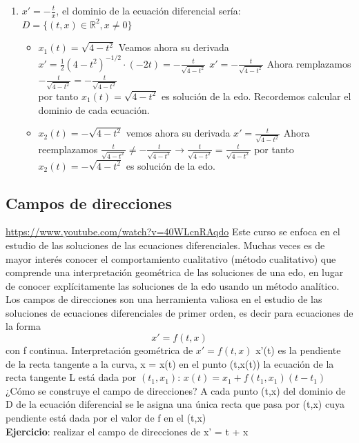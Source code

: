 \documentclass{book}
\begin{document}
\begin{enumerate}
         \item $x'=-\frac{t}{x}$, el dominio de la ecuación diferencial sería: $ D=\{(t,x)\in \mathbb{R}^{2}, x \neq 0\} $
            \begin{itemize}
                 \item $x_{1}(t)=\sqrt{4-t^{2}}$ Veamos ahora su derivada
                 $x' = \frac{1}{2}(4-t^{2})^{-1/2} \cdot (-2t) = -\frac{t}{\sqrt{4-t^{2}}}$
                 $x' = -\frac{t}{\sqrt{4-t^{2}}}$
                Ahora remplazamos\\
                $-\frac{t}{\sqrt{4-t^{2}}} = -\frac{t}{\sqrt{4-t^{2}}} $\\
                 por tanto $x_{1}(t)=\sqrt{4-t^{2}}$ es solución de la edo.
                 Recordemos calcular el dominio de cada ecuación.
                 \item $x_{2}(t)=-\sqrt{4-t^{2}}$ vemos ahora su derivada
                 $x'=\frac{t}{\sqrt{4-t^{2}}}$ Ahora reemplazamos
                 $\frac{t}{\sqrt{4-t^{2}}} \neq -\frac{t}{\sqrt{4-t^{2}}} \rightarrow \frac{t}{\sqrt{4-t^{2}}} = \frac{t}{\sqrt{4-t^{2}}}$
                 por tanto $x_{2}(t)=-\sqrt{4-t^{2}}$ es solución de la edo.
            \end{itemize}
    \end{enumerate}
    \subsection{Campos de direcciones}
     \url{https://www.youtube.com/watch?v=40WLcnRAqdo}
    Este curso se enfoca en el estudio de las soluciones de las ecuaciones
    diferenciales.
    Muchas veces es de mayor interés conocer el comportamiento cualitativo
    (método cualitativo) que comprende una interpretación geométrica de las
    soluciones de una edo, en lugar de conocer explícitamente las soluciones
    de la edo usando un método analítico.
    Los campos de direcciones son una herramienta valiosa en el estudio de
     las soluciones de ecuaciones diferenciales de primer orden, es decir para
    ecuaciones de la forma
    \begin{equation*}
        x'=f(t,x)
    \end{equation*}
     con f continua.
     Interpretación geométrica de $x'=f(t,x)$
    x'(t) es la pendiente de la recta tangente a la curva, x = x(t) en el punto (t,x(t))
     la ecuación de la recta tangente L está dada por $(t_{1},x_{1})$: $x(t)=x_{1}+f(t_{1},x_{1})(t-t_{1})$
     ¿Cómo se construye el campo de direcciones?
     A cada punto (t,x) del dominio de D de la ecuación diferencial se le asigna una única recta que pasa por
     (t,x) cuya pendiente está dada por el valor de f en el (t,x)
    \\ 
     \textbf{Ejercicio}: realizar el campo de direcciones de x' = t + x
\end{document}
